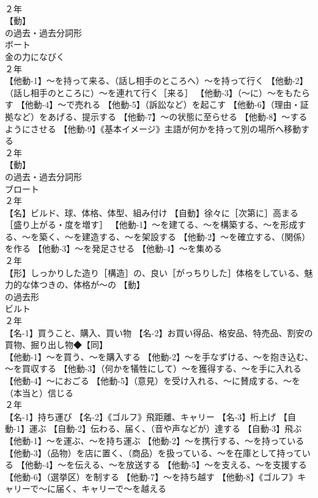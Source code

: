 \documentclass[8pt]{extreport}
\begin{document}
\begin{CJK}{UTF8}{min}
\\	２年	
\\	【動】
\\	の過去・過去分詞形 
\\	ボート 
\\	金の力になびく
\\	２年	
\\	【他動-1】～を持って来る、（話し相手のところへ）～を持って行く 【他動-2】（話し相手のところに）～を連れて行く［来る］ 【他動-3】（～に）～をもたらす 【他動-4】～で売れる 【他動-5】（訴訟など）を起こす 【他動-6】（理由・証拠など）をあげる、提示する 【他動-7】～の状態に至らせる 【他動-8】～するようにさせる 【他動-9】《基本イメージ》主語が何かを持って別の場所へ移動する
\\	２年	
\\	【動】
\\	の過去・過去分詞形 
\\	ブロート
\\	２年	
\\	【名】ビルド、球、体格、体型、組み付け 【自動】徐々に［次第に］高まる［盛り上がる・度を増す］ 【他動-1】～を建てる、～を構築する、～を形成する、～を築く、～を建造する、～を架設する 【他動-2】～を確立する、（関係）を作る 【他動-3】～を発足させる 【他動-4】～を集める
\\	２年	
\\	【形】しっかりした造り［構造］の、良い［がっちりした］体格をしている、魅力的な体つきの、体格が～の 【動】
\\	の過去形 
\\	ビルト
\\	２年	
\\	【名-1】買うこと、購入、買い物 【名-2】お買い得品、格安品、特売品、割安の買物、掘り出し物◆【同】
\\	【他動-1】～を買う、～を購入する 【他動-2】～を手なずける、～を抱き込む、～を買収する 【他動-3】（何かを犠牲にして）～を獲得する、～を手に入れる 【他動-4】～におごる 【他動-5】（意見）を受け入れる、～に賛成する、～を（本当と）信じる
\\	２年	
\\	【名-1】持ち運び 【名-2】《ゴルフ》飛距離、キャリー 【名-3】桁上げ 【自動-1】運ぶ 【自動-2】伝わる、届く、（音や声などが）達する 【自動-3】飛ぶ 【他動-1】～を運ぶ、～を持ち運ぶ 【他動-2】～を携行する、～を持っている 【他動-3】（品物）を店に置く、（商品）を扱っている、～を在庫として持っている 【他動-4】～を伝える、～を放送する 【他動-5】～を支える、～を支援する 【他動-6】（選挙区）を制する 【他動-7】～を持ち越す 【他動-8】《ゴルフ》キャリーで～に届く、キャリーで～を越える

\end{CJK}
\end{document}
